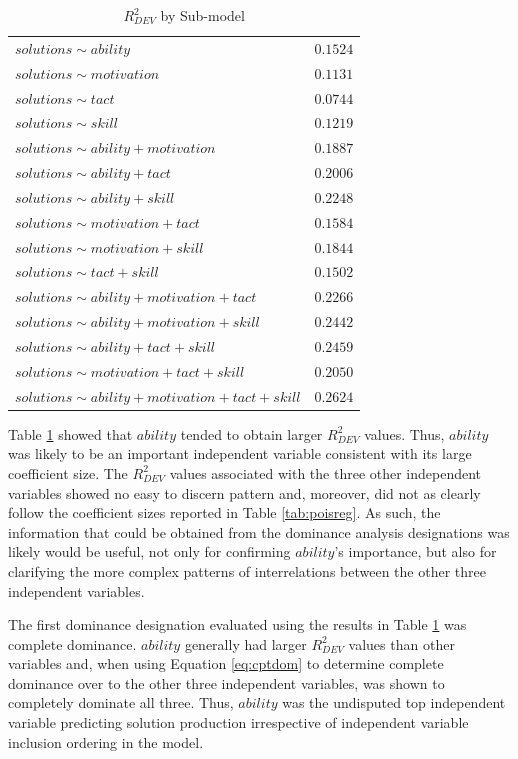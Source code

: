 \documentclass[man]{apa7}
\begin{document}
	\begin{table}[h!]
		\centering
		\caption{\centering $R^2_{DEV}$ by Sub-model}
		\begin{tabular}{l|r}
			\hline 
			$solutions \sim ability$ & $0.1524$ \\ 
			$solutions \sim motivation$ & $0.1131$ \\ 
			$solutions \sim tact$ & $0.0744$ \\ 
			$solutions \sim skill$ & $0.1219$ \\ 
			$solutions \sim ability + motivation$ & $0.1887$ \\ 
			$solutions \sim ability + tact$ & $0.2006$ \\ 
			$solutions \sim ability + skill$ & $0.2248$ \\ 
			$solutions \sim motivation + tact$ & $0.1584$ \\ 
			$solutions \sim motivation + skill$ & $0.1844$ \\ 
			$solutions \sim tact + skill$ & $0.1502$ \\ 
			$solutions \sim ability + motivation + tact$ & $0.2266$\\ 
			$solutions \sim ability + motivation + skill$ & $0.2442$ \\ 
			$solutions \sim ability + tact + skill$ & $0.2459$ \\ 
			$solutions \sim motivation + tact + skill$ & $0.2050$ \\ 
			$solutions \sim ability + motivation + tact + skill$ & $0.2624$ \\ 
			\hline 
		\end{tabular}
		\label{tab:r2sub}
	\end{table} 

	Table \ref{tab:r2sub} showed that $ability$ tended to obtain larger $R^2_{DEV}$ values.
	Thus, $ability$ was likely to be an important independent variable consistent with its large coefficient size. 
	The $R^2_{DEV}$ values associated with the three other independent variables showed no easy to discern pattern and, moreover, did not as clearly follow the coefficient sizes reported in Table \ref{tab:poisreg}.
	As such, the information that could be obtained from the dominance analysis designations was likely would be useful, not only for confirming $ability$'s importance, but also for clarifying the more complex patterns of interrelations between the other three independent variables.
	
	The first dominance designation evaluated using the results in Table \ref{tab:r2sub} was complete dominance.
	$ability$ generally had larger $R^2_{DEV}$ values than other variables and, when using Equation \ref{eq:cptdom} to determine complete dominance over to the other three independent variables, was shown to completely dominate all three.
	Thus, $ability$ was the undisputed top independent variable predicting solution production irrespective of independent variable inclusion ordering in the model.
\end{document}
